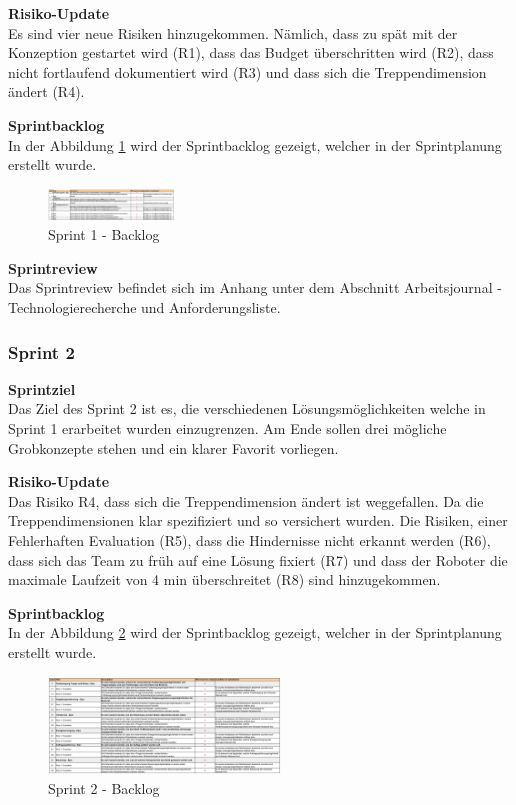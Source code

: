\textbf{Risiko-Update}\\
Es sind vier neue Risiken hinzugekommen. Nämlich, dass zu spät mit der Konzeption gestartet wird (R1), dass das Budget überschritten wird (R2), dass nicht fortlaufend dokumentiert wird (R3) und dass sich die Treppendimension ändert (R4).

\textbf{Sprintbacklog}\\
In der Abbildung \ref{fig:sprint-backlog-1} wird der Sprintbacklog gezeigt, welcher in der Sprintplanung erstellt wurde.
\begin{figure}[H]
  \includegraphics[angle=270,width=0.3\textwidth]{img/projektmanagement/sprint1-backlog.PNG}
  \centering
  \caption{Sprint 1 - Backlog}
  \label{fig:sprint-backlog-1}
\end{figure}

\newpage

\textbf{Sprintreview}\\
Das Sprintreview befindet sich im Anhang unter dem Abschnitt Arbeitsjournal - Technologierecherche und Anforderungsliste.


\subsubsection{Sprint 2}
\textbf{Sprintziel}\\
Das Ziel des Sprint 2 ist es, die verschiedenen Lösungsmöglichkeiten welche in Sprint 1 erarbeitet wurden einzugrenzen. Am Ende sollen drei mögliche Grobkonzepte stehen und ein klarer Favorit vorliegen.

\textbf{Risiko-Update}\\
Das Risiko R4, dass sich die Treppendimension ändert ist weggefallen. Da die Treppendimensionen klar spezifiziert und so versichert wurden. Die Risiken, einer Fehlerhaften Evaluation (R5), dass die Hindernisse nicht erkannt werden (R6), dass sich das Team zu früh auf eine Lösung fixiert (R7) und dass der Roboter die maximale Laufzeit von 4 min überschreitet (R8) sind hinzugekommen.

\textbf{Sprintbacklog}\\
In der Abbildung \ref{fig:sprint-backlog-2} wird der Sprintbacklog gezeigt, welcher in der Sprintplanung erstellt wurde.
\begin{figure}[H]
  \includegraphics[angle=270,width=0.55\textwidth]{img/projektmanagement/sprint2-backlog2.png}
  \centering
  \caption{Sprint 2 - Backlog}
  \label{fig:sprint-backlog-2}
\end{figure}

